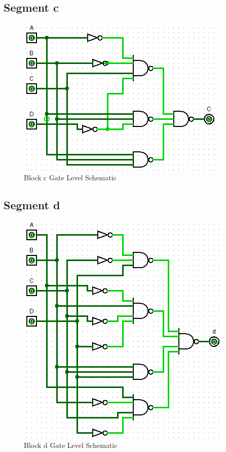 \documentclass[12pt]{article}
\begin{document}
\subsection{Segment c}
\begin{figure}[H]
	\centering
	\label{fig:cBlockGates}
	\includegraphics[width=0.5\linewidth, keepaspectratio]{c_logicCkt}
	\caption{Block c Gate Level Schematic}
\end{figure}

\subsection{Segment d}
\begin{figure}[H]
	\centering
	\label{fig:dBlockGates}
	\includegraphics[width=0.65\linewidth, keepaspectratio]{d_logicCkt}
	\caption{Block d Gate Level Schematic}
\end{figure}

\end{document}
